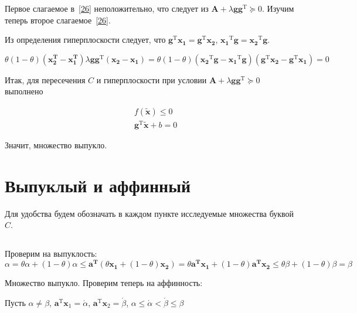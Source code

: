 	Первое слагаемое в~\eqref{26} неположительно, что следует из $\mathbf{A} + \lambda \mathbf{g}\mathbf{g}^\text{T} \succeq 0$. Изучим теперь второе слагаемое~\eqref{26}.
	
	Из определения гиперплоскости следует, что $\mathbf{g}^\text{T}\mathbf{x_1} = \mathbf{g}^\text{T}\mathbf{x_2}$, $\mathbf{x_1}^\text{T}\mathbf{g} = \mathbf{x_2}^\text{T}\mathbf{g}$.
	
	\begin{equation}
	\theta(1-\theta) (\mathbf{x_2^T} - \mathbf{x_1^T}) \lambda \mathbf{g}\mathbf{g}^\text{T} (\mathbf{x_2} -\mathbf{x_1}) = \theta(1-\theta)  ( \mathbf{x_2}^\text{T}\mathbf{g} - \mathbf{x_1}^\text{T}\mathbf{g}) (\mathbf{g}^\text{T} \mathbf{x_2} - \mathbf{g}^\text{T} \mathbf{x_1})=0
	\end{equation}
	
	Итак, для пересечения $C$ и гиперплоскости при условии $\mathbf{A} + \lambda \mathbf{g}\mathbf{g}^\text{T} \succeq 0$ выполнено 
	
	
	\begin{equation}
	\begin{split}
	&f(\mathbf{\tilde{x}}) \leqslant 0\\
	&\mathbf{g}^\text{T} \mathbf{\tilde{x}} + b =0
	\end{split}
	\end{equation}
	
	Значит, множество выпукло.
	
	\section{Выпуклый и аффинный}
	
	Для удобства будем обозначать в каждом пункте исследуемые множества буквой $C$.
	\subsection{}
	
	Проверим на выпуклость:
	\begin{equation}
	\alpha = \theta \alpha + (1 - \theta) \alpha \leqslant \mathbf{a^T} (\theta
	\mathbf{x_1} + (1 - \theta) \mathbf{x_2}) = \theta \mathbf{a^T} \mathbf{x_1} +
	(1 - \theta) \mathbf{a^T} \mathbf{x_2} \leqslant  \theta \beta + (1 - \theta)
	\beta = \beta 
	\end{equation}
	
	Множество выпукло. Проверим теперь на аффинность:
	
	Пусть $\alpha \neq \beta$, $\mathbf{a}^\text{T} \mathbf{x}_1 = \acute{\alpha}$, $\mathbf{a}^\text{T} \mathbf{x}_2 = \acute{\beta}$, $\alpha \leqslant \acute{\alpha} < \acute{\beta} \leqslant \beta$
	
